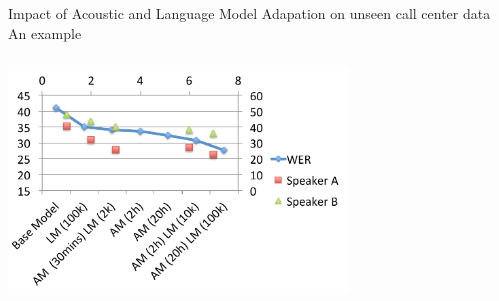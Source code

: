 \begin{frame} {Impact of Acoustic and Language Model Adapation on unseen call center data} {An example}
 \begin{center}
    \includegraphics[height=65mm,width=90mm]{figures/AdaptationPerformance.pdf}
  \end{center}
\end{frame}

